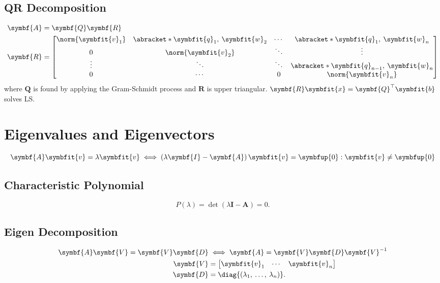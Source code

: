 \documentclass{article}
\begin{document}
\begin{multicols*}{3}
    \subsection{QR Decomposition}
    \begin{align*}
        \symbf{A} & = \symbf{Q} \symbf{R}                                                                                                                                                                  \\
        \symbf{R} & = \begin{bmatrix}
                          \norm{\symbfit{v}_1} & \abracket*{\symbfit{q}_1,\: \symbfit{w}_2} & \cdots & \abracket*{\symbfit{q}_1,\: \symbfit{w}_n}       \\
                          0                    & \norm{\symbfit{v}_2}                       & \ddots & \vdots                                           \\
                          \vdots               & \ddots                                     & \ddots & \abracket*{\symbfit{q}_{n - 1},\: \symbfit{w}_n} \\
                          0                    & \cdots                                     & 0      & \norm{\symbfit{v}_n}
                      \end{bmatrix}
    \end{align*}
    where \(\symbf{Q}\) is found by applying the Gram-Schmidt process and \(\symbf{R}\) is upper triangular. \(\symbf{R} \symbfit{x} = \symbf{Q}^\top \symbfit{b}\) solves LS\@.
    \section{Eigenvalues and Eigenvectors}
    \begin{equation*}
        \symbf{A} \symbfit{v} = \lambda \symbfit{v} \iff \left( \lambda \symbf{I} - \symbf{A} \right) \symbfit{v} = \symbfup{0} : \symbfit{v} \neq \symbfup{0}
    \end{equation*}
    \subsection{Characteristic Polynomial}
    \begin{equation*}
        P\left( \lambda \right) = \det{\left( \lambda \symbf{I} - \symbf{A} \right)} = 0.
    \end{equation*}
    \subsection{Eigen Decomposition}
    \begin{align*}
        \symbf{A} \symbf{V} = \symbf{V} \symbf{D}
                  & \iff
        \symbf{A} = \symbf{V} \symbf{D} \symbf{V}^{-1}                       \\
        \symbf{V} & = \begin{bmatrix}
                          \symbfit{v}_1 & \cdots & \symbfit{v}_n
                      \end{bmatrix}                 \\
        \symbf{D} & = \diag{\left( \lambda_1,\: \dots,\: \lambda_n \right)}.
    \end{align*}

\end{multicols*}
\end{document}
